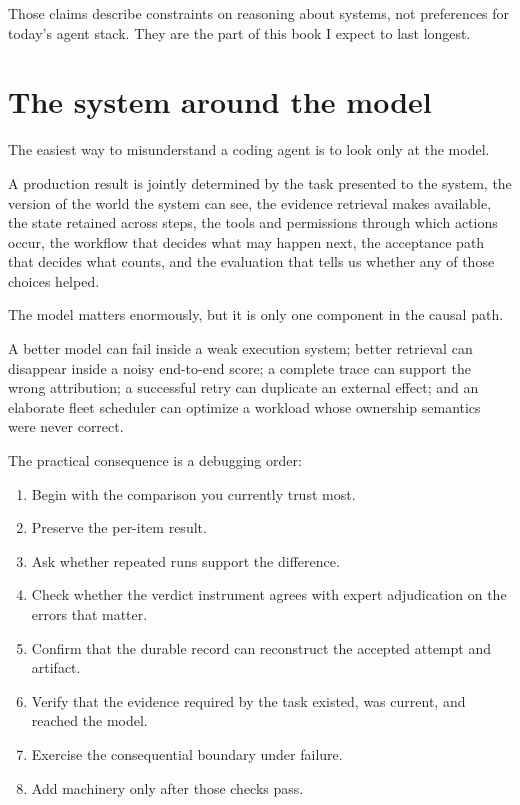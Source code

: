 Those claims describe constraints on reasoning about systems, not preferences for today's agent stack. They are the part of this book I expect to last longest.

\hypertarget{the-system-around-the-model}{%
\section{The system around the model}\label{the-system-around-the-model}}

The easiest way to misunderstand a coding agent is to look only at the model.

A production result is jointly determined by the task presented to the system, the version of the world the system can see, the evidence retrieval makes available, the state retained across steps, the tools and permissions through which actions occur, the workflow that decides what may happen next, the acceptance path that decides what counts, and the evaluation that tells us whether any of those choices helped.

The model matters enormously, but it is only one component in the causal path.

A better model can fail inside a weak execution system; better retrieval can disappear inside a noisy end-to-end score; a complete trace can support the wrong attribution; a successful retry can duplicate an external effect; and an elaborate fleet scheduler can optimize a workload whose ownership semantics were never correct.

The practical consequence is a debugging order:

\begin{enumerate}
\def\labelenumi{\arabic{enumi}.}
\item
  Begin with the comparison you currently trust most.
\item
  Preserve the per-item result.
\item
  Ask whether repeated runs support the difference.
\item
  Check whether the verdict instrument agrees with expert adjudication on the errors that matter.
\item
  Confirm that the durable record can reconstruct the accepted attempt and artifact.
\item
  Verify that the evidence required by the task existed, was current, and reached the model.
\item
  Exercise the consequential boundary under failure.
\item
  Add machinery only after those checks pass.
\end{enumerate}

